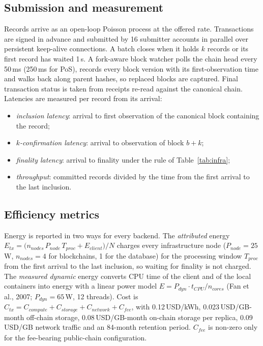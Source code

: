 \documentclass[10pt]{article}
\begin{document}
\subsection{Submission and measurement}
Records arrive as an open-loop Poisson process at the offered rate. Transactions are signed in advance and submitted
by 16 submitter accounts in parallel over persistent keep-alive connections. A batch closes when it holds $k$ records
or its first record has waited 1\,s. A fork-aware block watcher polls the chain head every 50\,ms (250\,ms for PoS),
records every block version with its first-observation time and walks back along parent hashes, so replaced blocks
are captured. Final transaction status is taken from receipts re-read against the canonical chain. Latencies are
measured per record from its arrival:
\begin{itemize}
\item \emph{inclusion latency}: arrival to first observation of the canonical block containing the record;
\item \emph{$k$-confirmation latency}: arrival to observation of block $b+k$;
\item \emph{finality latency}: arrival to finality under the rule of Table~\ref{tab:infra};
\item \emph{throughput}: committed records divided by the time from the first arrival to the last inclusion.
\end{itemize}

\subsection{Efficiency metrics}
Energy is reported in two ways for every backend. The \emph{attributed} energy
$E_{\mathit{tx}}=\bigl(n_{\mathit{nodes}}\,P_{\mathit{node}}\,T_{\mathit{proc}}+E_{\mathit{client}}\bigr)/N$
charges every infrastructure node ($P_{\mathit{node}}=25$\,W, $n_{\mathit{nodes}}=4$ for blockchains, 1 for the
database) for the processing window $T_{\mathit{proc}}$ from the first arrival to the last inclusion, so waiting for
finality is not charged. The \emph{measured dynamic} energy converts CPU time of the client and of the local containers
into energy with a linear power model $E=P_{\mathit{dyn}}\cdot t_{\mathit{CPU}}/n_{\mathit{cores}}$ (Fan et al., 2007;
$P_{\mathit{dyn}}=65$\,W, 12 threads). Cost is
$C_{\mathit{tx}}=C_{\mathit{compute}}+C_{\mathit{storage}}+C_{\mathit{network}}+C_{\mathit{fee}}$, with 0.12\,USD/kWh,
0.023\,USD/GB-month off-chain storage, 0.08\,USD/GB-month on-chain storage per replica, 0.09\,USD/GB network traffic
and an 84-month retention period. $C_{\mathit{fee}}$ is non-zero only for the fee-bearing public-chain configuration.
\end{document}
